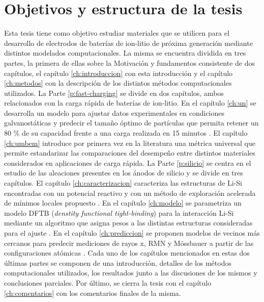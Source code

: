 \section{Objetivos y estructura de la tesis}

Esta tesis tiene como objetivo estudiar materiales que se utilicen para el 
desarrollo de electrodos de baterías de ion-litio de próxima generación mediante 
distintos modelados computacionales. 
La misma se encuentra dividida en tres partes, la primera de ellas sobre la 
Motivación y fundamentos consistente de dos capítulos, el capítulo 
\ref{ch:introduccion} con esta introducción y el capítulo \ref{ch:metodos} con la
descripción de los distintos métodos computacionales utilizados. 
La Parte \ref{p:fast-charging} se divide en dos capítulos, ambos relacionados con 
la carga rápida de baterías de ion-litio. En el capítulo \ref{ch:un} se 
desarrolla un modelo para ajustar datos experimentales en condiciones 
galvanostáticas y predecir el tamaño óptimo de partículas que permita retener un 
80 \% de su capacidad frente a una carga realizada en 15 minutos 
\cite{fernandez2023towards}. El capítulo \ref{ch:umbem} introduce por primera vez en la literatura una métrica 
universal que permite estandarizar las comparaciones del desempeño entre 
distintos materiales considerados en aplicaciones de carga rápida.
La Parte \ref{p:silicio} se centra en el estudio de las aleaciones presentes en 
los ánodos de silicio y se divide en tres capítulos. El capítulo 
\ref{ch:caracterizacion} caracteriza las estructuras de Li-Si encontradas con 
un potencial reactivo y con un método de exploración acelerada de mínimos locales
propuesto \cite{fernandez2021characterization}. En el capítulo \ref{ch:modelo} se
parametriza un modelo DFTB (\textit{denstity functional tight-binding}) para la 
interacción Li-Si mediante un algoritmo que asigna pesos a las distintas 
estructuras consideradas para el ajuste \cite{oviedo2023}. En el capítulo 
\ref{ch:prediccion} se proponen modelos de vecinos más cercanos para predecir 
mediciones de rayos x, RMN y Mössbauer a partir de las configuraciones atómicas
\cite{fernandez2023nmr}.
Cada uno de los capítulos mencionados en estas dos últimas partes se componen
de una introducción, detalles de los métodos computacionales utilizados, los 
resultados junto a las discusiones de los mismos y conclusiones parciales.
Por último, se cierra la tesis con el capítulo \ref{ch:comentarios} con los 
comentarios finales de la misma.

